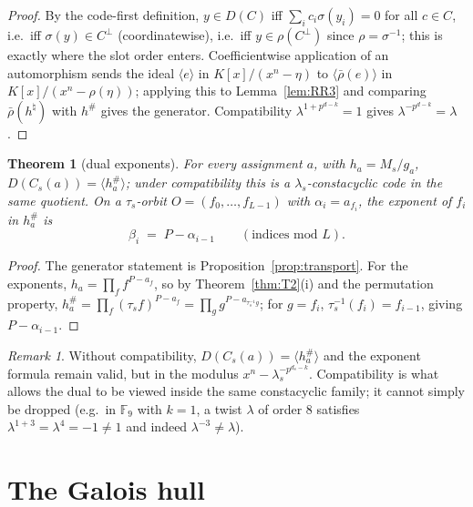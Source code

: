 \documentclass[10pt,journal,draftclsnofoot,onecolumn]{IEEEtran}
\newtheorem{theorem}{Theorem}[section]
\theoremstyle{definition}
\theoremstyle{remark}
\newtheorem*{remark}{Remark}
\begin{document}
\begin{proof}
By the code-first definition, \(y \in D(C)\) iff
\(\sum_i c_i \sigma(y_i) = 0\) for all \(c \in C\), i.e.\ iff
\(\sigma(y) \in C^\perp\) (coordinatewise), i.e.\ iff
\(y \in \rho(C^\perp)\) since \(\rho = \sigma^{-1}\); this is exactly
where the slot order enters. Coefficientwise application of an
automorphism sends the ideal \(\langle e \rangle\) in
\(K[x]/(x^n-\eta)\) to \(\langle \bar\rho(e)\rangle\) in
\(K[x]/(x^n - \rho(\eta))\); applying this to Lemma~\ref{lem:RR3} and
comparing \(\bar\rho(h^{\natural})\) with \(h^{\#}\) gives the generator.
Compatibility \(\lambda^{1+p^{d-k}}=1\) gives
\(\lambda^{-p^{d-k}} = \lambda\).
\end{proof}

\begin{theorem}[dual exponents]\label{thm:T3}
For every assignment \(a\), with \(h_a = M_s / g_a\),
\(D(C_s(a)) = \langle h_a^{\#} \rangle\); under compatibility this is a
\(\lambda_s\)-constacyclic code in the same quotient. On a
\(\tau_s\)-orbit \(O = (f_0,\dots,f_{L-1})\) with \(\alpha_i = a_{f_i}\),
the exponent of \(f_i\) in \(h_a^{\#}\) is
\[
\beta_i \;=\; P - \alpha_{i-1} \qquad (\text{indices mod } L).
\]
\end{theorem}

\begin{proof}
The generator statement is Proposition~\ref{prop:transport}. For the
exponents, \(h_a = \prod_{f} f^{P - a_f}\), so by Theorem~\ref{thm:T2}(i)
and the permutation property,
\(h_a^{\#} = \prod_f (\tau_s f)^{P-a_f} = \prod_{g} g^{P - a_{\tau_s^{-1} g}}\);
for \(g = f_i\), \(\tau_s^{-1}(f_i) = f_{i-1}\), giving \(P - \alpha_{i-1}\).
\end{proof}

\begin{remark}
Without compatibility, \(D(C_s(a)) = \langle h_a^{\#}\rangle\) and the
exponent formula remain valid, but in the modulus
\(x^n - \lambda_s^{-p^{d_s-k}}\). Compatibility is what allows the dual
to be viewed inside the same constacyclic family; it cannot simply be
dropped (e.g.\ in \(\mathbb{F}_9\) with \(k=1\), a twist \(\lambda\) of
order \(8\) satisfies \(\lambda^{1+3} = \lambda^4 = -1 \ne 1\) and indeed
\(\lambda^{-3} \ne \lambda\)).
\end{remark}

\section{The Galois hull}\label{sec:hull}
\end{document}
